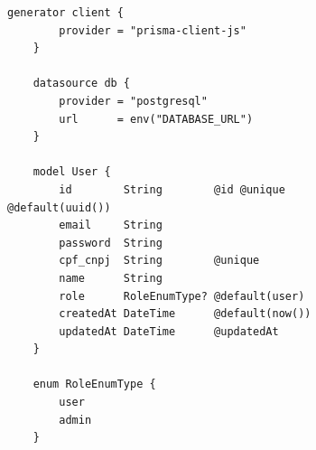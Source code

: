 \begin{figure}[h]
	\begin{lstlisting}[caption={Exemplo de um schema no Prisma.}, label={code:prisma}]
	generator client {
		provider = "prisma-client-js"
	}
	
	datasource db {
		provider = "postgresql"
		url      = env("DATABASE_URL")
	}
	
	model User {
		id        String        @id @unique @default(uuid())
		email     String        
		password  String
		cpf_cnpj  String        @unique
		name      String
		role      RoleEnumType? @default(user)
		createdAt DateTime      @default(now())
		updatedAt DateTime      @updatedAt
	}
	
	enum RoleEnumType {
		user
		admin
	}
		
	\end{lstlisting}
	
	\end{figure}
